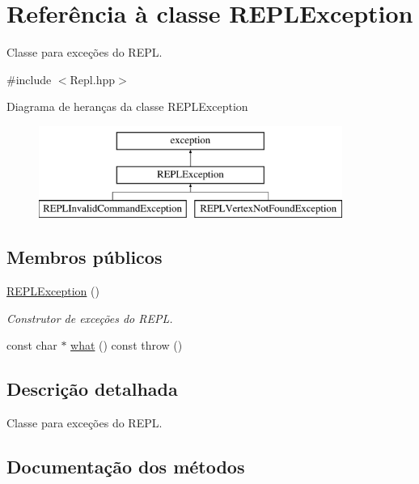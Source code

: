 \hypertarget{classREPLException}{}\section{Referência à classe R\+E\+P\+L\+Exception}
\label{classREPLException}


Classe para exceções do R\+E\+PL.  




{\ttfamily \#include $<$Repl.\+hpp$>$}

Diagrama de heranças da classe R\+E\+P\+L\+Exception\begin{figure}[H]
\begin{center}
\leavevmode
\includegraphics[height=3.000000cm]{classREPLException}
\end{center}
\end{figure}
\subsection*{Membros públicos}
\begin{DoxyCompactItemize}
\item 
\mbox{\label{classREPLException_abf6ea066b56e3730779929040b4f4762}} 
\hyperlink{classREPLException_abf6ea066b56e3730779929040b4f4762}{R\+E\+P\+L\+Exception} ()
\begin{DoxyCompactList}\small\item\em Construtor de exceções do R\+E\+PL. \end{DoxyCompactList}\item 
const char $\ast$ \hyperlink{classREPLException_adf62c4f994bf3302c2e659899ae936fb}{what} () const  throw ()
\end{DoxyCompactItemize}


\subsection{Descrição detalhada}
Classe para exceções do R\+E\+PL. 

\subsection{Documentação dos métodos}
\mbox{\label{classREPLException_adf62c4f994bf3302c2e659899ae936fb}} 
